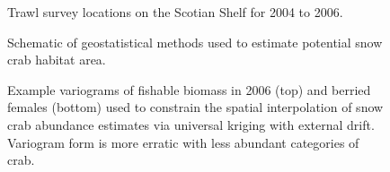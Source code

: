 \documentclass[11pt]{article}
\newcommand*{\D}{.}  %
\begin{document}
\newpage
\begin{figure}[ht]
\begin{center}
\begin{minipage}{4in}
\end{minipage}
\begin{minipage}{4in}
\end{minipage}
\begin{minipage}{4in}
\end{minipage}
\end{center}
\caption{Trawl survey locations on the Scotian Shelf for 2004 to 2006. }
\label{trawl.survey.locations}
\end{figure}

\begin{landscape}
\begin{figure}[!ht]
\begin{center}
\end{center}
\caption{Schematic of geostatistical methods used to estimate potential snow crab habitat area.}
\label{fig:method}
\end{figure}
\end{landscape}

\clearpage \newpage

\begin{figure}[h]
\begin{center}
\end{center}
\caption{Example variograms of fishable biomass in 2006 (top) and berried females (bottom) used to constrain the spatial interpolation of snow crab abundance estimates via universal kriging with external drift. Variogram form is more erratic with less abundant categories of crab.}
\label{fig:variogram}
\end{figure}
\end{document}
